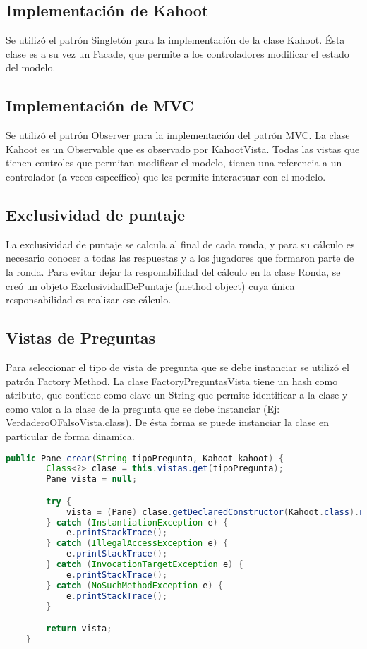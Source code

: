 \documentclass[titlepage,a4paper]{article}
\begin{document}
\subsection{Implementación de Kahoot} Se utilizó el patrón Singletón para la implementación de la clase Kahoot. Ésta clase es a su vez un Facade, que permite a los controladores modificar el estado del modelo.
\subsection{Implementación de MVC} Se utilizó el patrón Observer para la implementación del patrón MVC. La clase Kahoot es un Observable que es observado por KahootVista. Todas las vistas que tienen controles que permitan modificar el modelo, tienen una referencia a un controlador (a veces específico) que les permite interactuar con el modelo.
\subsection{Exclusividad de puntaje} La exclusividad de puntaje se calcula al final de cada ronda, y para su cálculo es necesario conocer a todas las respuestas y a los jugadores que formaron parte de la ronda. Para evitar dejar la responabilidad del cálculo en la clase Ronda, se creó un objeto ExclusividadDePuntaje (method object) cuya única responsabilidad es realizar ese cálculo.
\subsection{Vistas de Preguntas} Para seleccionar el tipo de vista de pregunta que se debe instanciar se utilizó el patrón Factory Method. La clase FactoryPreguntasVista tiene un hash como atributo, que contiene como clave un String que permite identificar a la clase y como valor a la clase de la pregunta que se debe instanciar (Ej: VerdaderoOFalsoVista.class). De ésta forma se puede instanciar la clase en particular de forma dinamica.
\begin{lstlisting}[language=java]
    public Pane crear(String tipoPregunta, Kahoot kahoot) {
        Class<?> clase = this.vistas.get(tipoPregunta);
        Pane vista = null;

        try {
            vista = (Pane) clase.getDeclaredConstructor(Kahoot.class).newInstance(kahoot);
        } catch (InstantiationException e) {
            e.printStackTrace();
        } catch (IllegalAccessException e) {
            e.printStackTrace();
        } catch (InvocationTargetException e) {
            e.printStackTrace();
        } catch (NoSuchMethodException e) {
            e.printStackTrace();
        }

        return vista;
    }

\end{lstlisting}
\end{document}
